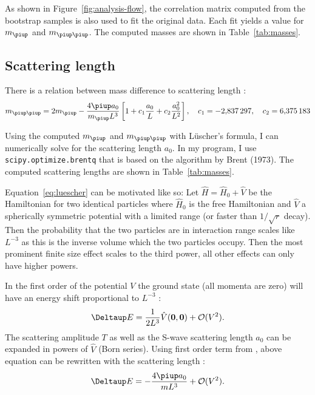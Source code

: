 \documentclass[11pt, english, fleqn, DIV=10, headinclude]{scrartcl}
\newcommand\mpi{m_{\piup}}
\newcommand\mpipi{m_{\piup\piup}}
\begin{document}
As shown in Figure~\ref{fig:analysis-flow}, the correlation matrix computed from
the bootstrap samples is also used to fit the original data. Each fit yields a
value for $\mpi$ and $\mpipi$. The computed masses are shown in
Table~\ref{tab:masses}.

\subsection{Scattering length}
\label{sec:scattering_length}

There is a relation between mass difference to scattering length
\parencite[(1.3)]{luescher/volume_dependence}:
\begin{equation}
    \label{eq:luescher}
    \mpipi = 2\mpi - \frac{4 \piup a_0}{\mpi L^3} \sbr{1 + c_1 \frac{a_0}L + c_2 \frac{a_0^2}{L^2}}
    \eqnsep
    c_1 = \num{-2.837297}
    \eqnsep
    c_2 = \num{6.375183}
\end{equation}

Using the computed $\mpi$ and $\mpipi$ with Lüscher's formula, I can
numerically solve for the scattering length $a_0$. In my program, I use
\texttt{scipy.optimize.brentq} that is based on the algorithm by Brent (1973).
The computed scattering lengths are shown in Table~\ref{tab:masses}.

Equation~\eqref{eq:luescher} can be motivated like so: Let $\hat H = \hat H_0 +
\hat V$ be the Hamiltonian for two identical particles where $\hat H_0$ is the
free Hamiltonian and $\hat V$ a spherically symmetric potential with a limited
range (or faster than $1/\sqrt r$ decay). Then the probability that the two
particles are in interaction range scales like $L^{-3}$ as this is the inverse
volume which the two particles occupy. Then the most prominent finite size
effect scales to the third power, all other effects can only have higher
powers.

In the first order of the potential $V$ the ground state (all momenta are zero)
will have an energy shift proportional to $L^{-3}$
\parencite[(2.24)]{luescher/volume_dependence}:
\[
    \Deltaup E = \frac{1}{2L^3} \hat V(\vec 0, \vec 0) + \mathcal O(V^2).
\]
The scattering amplitude $T$ as well as the S-wave scattering length $a_0$ can
be expanded in powers of $\hat V$ (Born series). Using first order term from
\parencite[(2.18)]{luescher/volume_dependence}, above equation can be rewritten
with the scattering length
\parencite[(2.25)]{luescher/volume_dependence}:
\[
    \Deltaup E = - \frac{4\piup a_0}{m L^3} + \mathcal O(V^2).
\]
\end{document}
